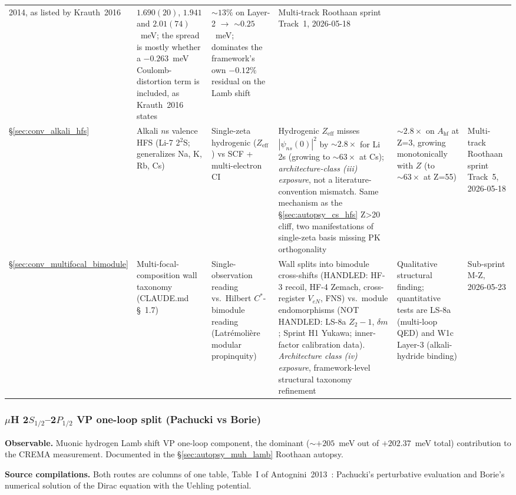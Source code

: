 \documentclass[11pt]{article}
\begin{document}
\begin{table}[h]
\begin{tabular}{p{0.6cm} p{2.6cm} p{3.0cm} p{2.6cm} p{1.6cm} p{1.6cm}}
2014, as listed by Krauth~2016 &
$1.690(20)$, $1.941$ and $2.01(74)$~meV; the spread is mostly
whether a $-0.263$~meV Coulomb-distortion term is included, as
Krauth~2016 states &
$\sim 13\%$ on Layer-2 $\to$ $\sim 0.25$~meV; dominates the
framework's own $-0.12\%$ residual on the Lamb shift &
Multi-track Roothaan sprint Track~1, 2026-05-18 \\
\S\ref{sec:conv_alkali_hfs} &
Alkali $n$s valence HFS (Li-7 2$^2$S; generalizes Na, K, Rb, Cs) &
Single-zeta hydrogenic ($Z_\text{eff}$) vs SCF + multi-electron CI &
Hydrogenic $Z_\text{eff}$ misses $|\psi_{ns}(0)|^2$ by $\sim 2.8\times$
for Li 2s (growing to $\sim 63\times$ at Cs); \emph{architecture-class (iii) exposure}, not a
literature-convention mismatch.  Same mechanism as the
\S\ref{sec:autopsy_cs_hfs} Z\textgreater 20 cliff, two manifestations
of single-zeta basis missing PK orthogonality &
$\sim 2.8\times$ on $A_\text{hf}$ at Z=3, growing monotonically with
$Z$ (to $\sim 63\times$ at Z=55) &
Multi-track Roothaan sprint Track~5, 2026-05-18 \\
\S\ref{sec:conv_multifocal_bimodule} &
Multi-focal-composition wall taxonomy (CLAUDE.md \S~1.7) &
Single-observation reading vs.\ Hilbert $C^*$-bimodule reading
(Latr\'emoli\`ere modular propinquity) &
Wall splits into bimodule cross-shifts (HANDLED: HF-3 recoil, HF-4
Zemach, cross-register $V_{eN}$, FNS) vs.\
module endomorphisms (NOT HANDLED: LS-8a $Z_2-1$, $\delta m$;
Sprint H1 Yukawa; inner-factor calibration data).  \emph{Architecture
class (iv) exposure}, framework-level structural taxonomy refinement &
Qualitative structural finding;
quantitative tests are LS-8a (multi-loop QED) and
W1c Layer-3 (alkali-hydride binding) &
Sub-sprint M-Z, 2026-05-23 \\
\bottomrule
\end{tabular}
\end{table}

\subsubsection{$\mu$H 2$S_{1/2}$--2$P_{1/2}$ VP one-loop split (Pachucki vs Borie)}
\label{sec:conv_muH_VP}

\textbf{Observable.}  Muonic hydrogen Lamb shift VP one-loop
component, the dominant ($\sim +205$~meV out of $+202.37$~meV total)
contribution to the CREMA measurement.  Documented in the
\S\ref{sec:autopsy_muh_lamb} Roothaan autopsy.

\textbf{Source compilations.}  Both routes are columns of one table,
Table~I of Antognini~2013~\cite{antognini2013_theory}: Pachucki's
perturbative evaluation and Borie's numerical solution of the Dirac
equation with the Uehling potential.
\end{document}
